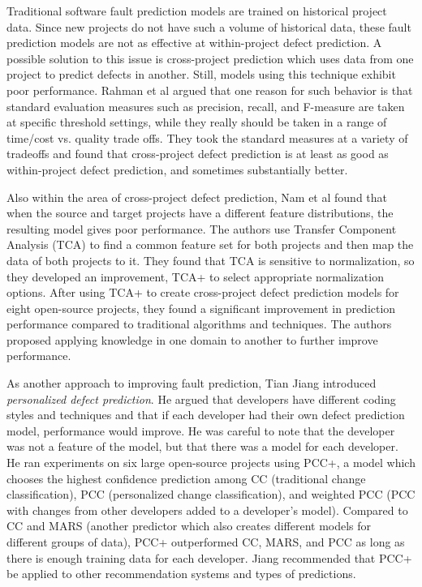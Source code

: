 \documentclass{sig-alternate-05-2015}
\begin{document}
Traditional software fault prediction models are trained on historical project data. Since new projects do not have such a volume of historical data, these fault prediction models are not as effective at within-project defect prediction. A possible solution to this issue is cross-project prediction which uses data from one project to predict defects in another. Still, models using this technique exhibit poor performance. Rahman et al \cite{Rahman} argued that one reason for such behavior is that standard evaluation measures such as precision, recall, and F-measure are taken at specific threshold settings, while they really should be taken in a range of time/cost vs. quality trade offs. They took the standard measures at a variety of tradeoffs and found that cross-project defect prediction is at least as good as within-project defect prediction, and sometimes substantially better.

Also within the area of cross-project defect prediction, Nam et al \cite{Nam} found that when the source and target projects have a different feature distributions, the resulting model gives poor performance. The authors use Transfer Component Analysis (TCA) to find a common feature set for both projects and then map the data of both projects to it. They found that TCA is sensitive to normalization, so they developed an improvement, TCA+ to select appropriate normalization options. After using TCA+ to create cross-project defect prediction models for eight open-source projects, they found a significant improvement in prediction performance compared to traditional algorithms and techniques. The authors proposed applying knowledge in one domain to another to further improve performance. 

As another approach to improving fault prediction, Tian Jiang \cite{Jiang} introduced \emph{personalized defect prediction}. He argued that developers have different coding styles and techniques and that if each developer had their own defect prediction model, performance would improve. He was careful to note that the developer was not a feature of the model, but that there was a model for each developer. He ran experiments on six large open-source projects using PCC+, a model which chooses the highest confidence prediction among CC (traditional change classification), PCC (personalized change classification), and weighted PCC (PCC with changes from other developers added to a developer's model). Compared to CC and MARS (another predictor which also creates different models for different groups of data), PCC+ outperformed CC, MARS, and PCC as long as there is enough training data for each developer. Jiang recommended that PCC+ be applied to other recommendation systems and types of predictions.
\end{document}
